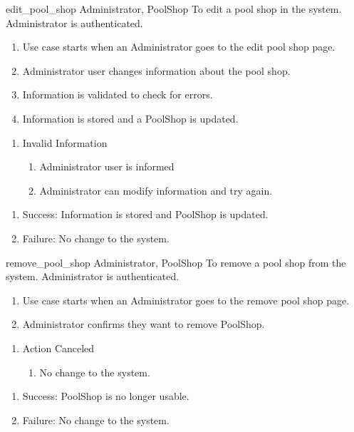 \usecase
{edit\_pool\_shop}
{Administrator, PoolShop}
{To edit a pool shop in the system.}
{Administrator is authenticated.}
{
\begin{enumerate}
\item Use case starts when an Administrator goes to the edit pool shop page.
\item Administrator user changes information about the pool shop.
\item Information is validated to check for errors.
\item Information is stored and a PoolShop is updated.
\end{enumerate}
}
{
\begin{enumerate}
\item Invalid Information
\begin{enumerate}
\item Administrator user is informed
\item Administrator can modify information and try again.
\end{enumerate}
\end{enumerate}
}
{
\begin{enumerate}
\item Success: Information is stored and PoolShop is updated.
\item Failure: No change to the system.
\end{enumerate}
}

\usecase
{remove\_pool\_shop}
{Administrator, PoolShop}
{To remove a pool shop from the system.}
{Administrator is authenticated.}
{
\begin{enumerate}
\item Use case starts when an Administrator goes to the remove pool shop page.
\item Administrator confirms they want to remove PoolShop.
\end{enumerate}
}
{
\begin{enumerate}
\item Action Canceled
\begin{enumerate}
\item No change to the system.
\end{enumerate}
\end{enumerate}
}
{
\begin{enumerate}
\item Success: PoolShop is no longer usable.
\item Failure: No change to the system.
\end{enumerate}
}

